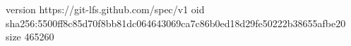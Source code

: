 version https://git-lfs.github.com/spec/v1
oid sha256:5500ff8c85d70f8bb81dc064643069ca7c86b0ed18d29fe50222b38655afbe20
size 465260
